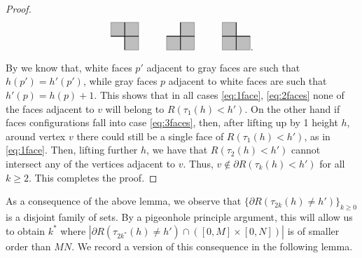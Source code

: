 \documentclass[reqno,11pt]{amsart}
\numberwithin{equation}{section}
\theoremstyle{definition}
\begin{document}
\begin{proof}
\begin{equation}
\begin{tikzpicture}
            \draw[thick,xshift=2cm] (0,0) -- (1,0);
            \draw[thick,xshift=2cm] (.5,-.5) -- (.5,.5);
            \draw[fill=gray,opacity=.5,xshift=2.5cm] (0,0) -- (.5,0) -- (.5,.5) -- (0,.5) -- (0,0);
            \draw[fill=gray,opacity=.5,xshift=2.5cm,yshift=-.5cm] (0,0) -- (.5,0) -- (.5,.5) -- (0,.5) -- (0,0);
            \draw[fill=gray,opacity=.5,xshift=2cm] (0,0) -- (.5,0) -- (.5,.5) -- (0,.5) -- (0,0);

            \draw[thick,xshift=4cm] (0,0) -- (1,0);
            \draw[thick,xshift=4cm] (.5,-.5) -- (.5,.5);
            \draw[fill=gray,opacity=.5,xshift=4cm,yshift=-.5cm] (0,0) -- (.5,0) -- (.5,.5) -- (0,.5) -- (0,0);
            \draw[fill=gray,opacity=.5,xshift=4.5cm,yshift=-.5cm] (0,0) -- (.5,0) -- (.5,.5) -- (0,.5) -- (0,0);
            \draw[fill=gray,opacity=.5,xshift=4.5cm] (0,0) -- (.5,0) -- (.5,.5) -- (0,.5) -- (0,0);

            \draw[thick,xshift=6cm] (0,0) -- (1,0);
            \draw[thick,xshift=6cm] (.5,-.5) -- (.5,.5);
            \draw[fill=gray,opacity=.5,xshift=6.5cm,yshift=-.5cm] (0,0) -- (.5,0) -- (.5,.5) -- (0,.5) -- (0,0);
            \draw[fill=gray,opacity=.5,xshift=6cm,yshift=-.5cm] (0,0) -- (.5,0) -- (.5,.5) -- (0,.5) -- (0,0);
            \draw[fill=gray,opacity=.5,xshift=6cm] (0,0) -- (.5,0) -- (.5,.5) -- (0,.5) -- (0,0);
        \end{tikzpicture}
        .
    \end{equation}
    By  we know that, white faces $p'$ adjacent to gray faces are such that $h(p')=h'(p')$, while gray faces $p$ adjacent to white faces are such that $h'(p)=h(p)+1$. This shows that in all cases \eqref{eq:1face}, \eqref{eq:2faces} none of the faces adjacent to $v$ will belong to $R(\tau_1(h)<h')$. On the other hand if faces configurations fall into case \eqref{eq:3faces}, then, after lifting up by 1 height $h$, around vertex $v$ there could still be a single face of $R(\tau_1(h)<h')$, as in \eqref{eq:1face}. Then, lifting further $h$, we have that $R(\tau_2(h)<h')$ cannot intersect any of the vertices adjacent to $v$. Thus, $v\notin \partial R(\tau_k(h)<h')$ for all $k\ge 2$. This completes the proof.
\end{proof}

As a consequence of the above lemma, we observe that $\{\partial R(\tau_{2k}(h)\neq h')\}_{k\ge 0}$ is a disjoint family of sets. By a pigeonhole principle argument, this will allow us to obtain $k^*$ where $|\partial R(\tau_{2k^*}(h)\neq h') \cap ([0,M]\times [0,N])|$ is of smaller order than $MN$. We record a version of this consequence in the following lemma. 
\end{document}
